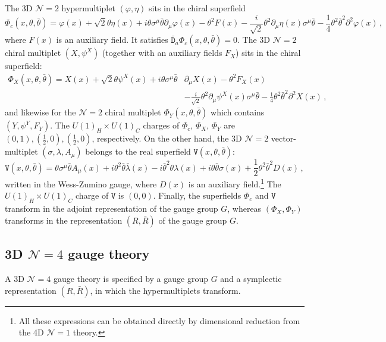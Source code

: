 \documentclass[12pt,a4paper]{article}
\renewcommand{\(}{\left(}
\renewcommand{\)}{\right)}
\renewcommand{\(}{\left(}
\renewcommand{\)}{\right)}
\begin{document}
The 3D $\mathcal{N}=2$ hypermultiplet $(\varphi,\eta)$ sits in the chiral superfield
\begin{equation}
\mathtt{\Phi}_c(x,\theta,\bar{\theta})=\varphi(x)+\sqrt{2}\theta\eta(x)+i\theta\sigma^{\mu}\bar{\theta}\partial_\mu\varphi(x)-\theta^2 F(x)-\frac{i}{\sqrt{2}}\theta^2\partial_\mu \eta(x) \sigma^{\mu}\bar{\theta}-\frac{1}{4}\theta^2\bar{\theta}^2\partial^2\varphi(x) \,,
\end{equation}
where $F(x)$ is an auxiliary field. 
It satisfies $\bar{\mathtt{D}}_a\mathtt{\Phi}_c(x,\theta,\bar{\theta})=0$. 
The 3D  $\mathcal{N}=2$ chiral multiplet 
$(X,\psi^X)$ (together with an auxiliary fields $F_X$)
sits in the chiral superfield:
\begin{equation}
\begin{aligned}
\mathtt{\Phi}_X(x,\theta,\bar{\theta})=X(x)+\sqrt{2}\theta\psi^X(x)+i\theta\sigma^{\mu}\bar{\theta}&\partial_\mu X(x)-\theta^2 F_X(x)\\
&-\frac{i}{\sqrt{2}}\theta^2\partial_\mu \psi^X(x) \sigma^{\mu}\bar{\theta}-\frac{1}{4}\theta^2\bar{\theta}^2\partial^2 X(x) \,,
\end{aligned}
\end{equation}
and likewise for the $\mathcal{N}=2$ chiral multiplet $\mathtt{\Phi}_Y(x,\theta,\bar{\theta})$ which contains $(Y,\psi^Y,F_Y)$. 
The $U(1)_H\times U(1)_C$ charges of $\mathtt{\Phi}_c$, $\mathtt{\Phi}_X$, $\mathtt{\Phi}_Y$ are $(0,1),(\frac{1}{2},0),(\frac{1}{2},0)$, respectively. 
On the other hand, the 3D $\mathcal{N}=2$ vector-multiplet $(\sigma,\lambda,A_\mu)$ belongs to the real superfield $\mathtt{V}(x,\theta,\bar{\theta})$:
\begin{equation}\label{eq:VDef}
\mathtt{V}(x,\theta,\bar{\theta})=\theta\sigma^{\mu}\bar{\theta}A_\mu(x)+i\theta^2\bar{\theta}\bar{\lambda}(x)-i\bar{\theta}^2\theta\lambda(x)+i\theta\bar{\theta}\sigma(x)+\frac{1}{2}\theta^2\bar{\theta}^2D(x)\,,
\end{equation}
written in the Wess-Zumino gauge, where $D(x)$ is an auxiliary field.\footnote{All these expressions can be obtained directly by dimensional reduction from the 4D $\mathcal{N}=1$ theory.} The $U(1)_H\times U(1)_C$ charge of $\mathtt{V}$ is $(0,0)$. 
Finally, the superfields $\mathtt{\Phi}_{c}$ and $\mathtt{V}$ transform in the adjoint representation of the gauge group $G$, whereas $(\mathtt{\Phi}_X,\mathtt{\Phi}_Y)$ transforms in the representation $(R,\bar{R})$ of the gauge group $G$. 


\subsection{\texorpdfstring{3D $\mathcal{N}=4$ gauge theory}{3D N=4 gauge theory}}\label{ssec:3D_SYM}
A 3D $\mathcal{N}=4$ gauge theory is specified by a gauge group $G$ and a symplectic representation $(R, \bar{R})$, in which the hypermultiplets transform.
\end{document}

